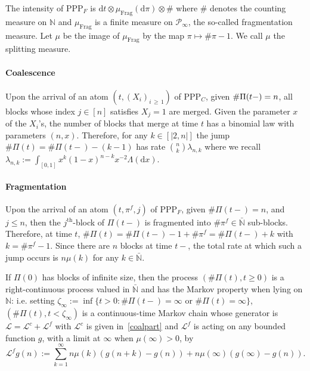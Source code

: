 \documentclass[AHL,Unicode,longabstracts,published]{cedram}
\newcommand{\ddr}{\mathrm{d}}
\newcommand{\PPP}{\mathrm{PPP}}
\newcommand{\Frag}{\mathrm{Frag}}
\newcommand{\bbN}{\mathbb{N}}
\newcommand{\clL}{\mathcal{L}}
\newcommand{\clP}{\mathcal{P}}
\begin{document}
The intensity of $\PPP_F$ is $\ddr t\otimes \mu_{\Frag}(\ddr \pi)\otimes \#$ where $\#$ denotes the counting measure on $\bbN$ and $\mu_{\Frag}$ is a finite measure on $\clP_\infty$, the so-called fragmentation measure. Let $\mu$ be the image of $\mu_{\Frag}$ by the map $\pi \mapsto \#\pi-1$. We call $\mu$ the splitting measure.

\paragraph{Coalescence} Upon the arrival of an atom $(t,(X_i)_{i\,\geq\,1})$ of $\PPP_C$, given $\#\Pi(t-)\linebreak=n$, all blocks whose index $j\in [n]$ satisfies $X_{j}=1$ are merged. Given the parameter $x$ of the $X_i$'s, the number of blocks that merge at time $t$ has a binomial law with parameters $(n,x)$. Therefore, for any $k\in [|2,n|]$ the jump $\#\Pi(t)=\#\Pi(t-)-(k-1)$ has rate $\binom{n}{k}\lambda_{n,k}$ where we recall $\lambda_{n,k}:=\int_{[0,1]}x^{k}(1-x)^{n-k}x^{-2}\Lambda(\ddr x)$.
\vspace*{1mm}

\paragraph{Fragmentation} Upon the arrival of an atom $(t,\pi^{f},j)$ of $\PPP_F$, given $\#\Pi(t-)=n$, and $j\leq n$, then the $j^{\mathrm{th}}$-block of $\Pi(t-)$ is fragmented into $\#\pi^{f}\in \bar{\bbN}$ sub-blocks. Therefore, at time $t$, $\#\Pi(t)=\#\Pi(t-)-1+\#\pi^{f}=\#\Pi(t-)+k$ with $k=\#\pi^{f}-1$. Since there are $n$ blocks at time $t-$, the total rate at which such a jump occurs is $n\mu(k)$ for any $k\in \bar{\bbN}$.

\begin{lemm}\label{genEFC}
If $\Pi(0)$ has blocks of infinite size, then the process $(\#\Pi(t),t\geq 0)$ is a right-continuous process valued in $\bar{\bbN}$ and has the Markov property when lying on $\bbN$: i.e. setting $\zeta_{\infty}:=\inf\{t>0: \#\Pi(t-)=\infty \text{ or } \#\Pi(t)=\infty\}$, $(\#\Pi(t),t<\zeta_{\infty})$ is a continuous-time Markov chain whose generator is $\clL=\clL^c+\clL^f$ with $\clL^{c}$ is given in~\eqref{coalpart} and $\clL^f$ is acting on any bounded function $g$, with a limit at $\infty$ when $\mu(\infty)>0$, by
\begin{equation}\label{fragpart}
\clL^f g(n):=\sum_{k=1}^{\infty}n\mu(k)(g(n+k)-g(n))+n\mu(\infty)(g(\infty)-g(n)).
\end{equation}
\end{lemm}
\end{document}
